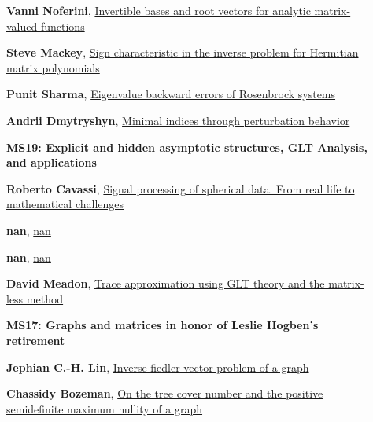\documentclass[ILAS2025-program.tex]{subfiles}
\begin{document}
\begin{description}
\begin{description}
    \item[] \hypertarget{up0213}{}\textbf{Vanni Noferini}, \hyperlink{down0213}{Invertible bases and root vectors for analytic matrix-valued functions}
        \item[] \hypertarget{up0214}{}\textbf{Steve Mackey}, \hyperlink{down0214}{Sign characteristic in the inverse problem for Hermitian matrix polynomials}
        \item[] \hypertarget{up0215}{}\textbf{Punit Sharma}, \hyperlink{down0215}{Eigenvalue backward errors of Rosenbrock systems}
        \item[] \hypertarget{up0216}{}\textbf{Andrii Dmytryshyn}, \hyperlink{down0216}{Minimal indices through perturbation behavior}
        \end{description}
    \begin{description}
    \item[] {\color{mstitle}\textbf{MS19: Explicit and hidden asymptotic structures, GLT Analysis, and applications}} 
    \item[] \hypertarget{up0217}{}\textbf{Roberto Cavassi}, \hyperlink{down0217}{Signal processing of spherical data. From real life to mathematical challenges}
        \item[] \hypertarget{up0218}{}\textbf{nan}, \hyperlink{down0218}{nan}
        \item[] \hypertarget{up0219}{}\textbf{nan}, \hyperlink{down0219}{nan}
        \item[] \hypertarget{up0220}{}\textbf{David Meadon}, \hyperlink{down0220}{Trace approximation using GLT theory and the matrix-less method
}
        \end{description}
    \begin{description}
    \item[] {\color{mstitle}\textbf{MS17: Graphs and matrices in honor of Leslie Hogben's retirement}} 
    \item[] \hypertarget{up0221}{}\textbf{Jephian C.-H. Lin}, \hyperlink{down0221}{Inverse fiedler vector problem of a graph
}
        \item[] \hypertarget{up0222}{}\textbf{Chassidy Bozeman}, \hyperlink{down0222}{On the tree cover number and the positive semidefinite maximum nullity of a graph}

\end{description}
\end{description}
\end{document}
